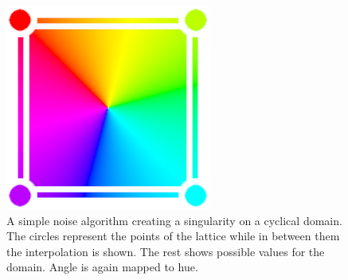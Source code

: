 \documentclass{utue} %
\begin{document}
\begin{figure}[h]
  \centering
  \includegraphics[width=0.49\linewidth]{images/simpleAlgo}
  \caption{A simple noise algorithm creating a singularity on a cyclical domain. The circles represent the points of the lattice while in between them the interpolation is shown. The rest shows possible values for the domain. Angle is again mapped to hue.}\label{fig:simpleAlgirithmSingularity}
\end{figure}
\end{document}
